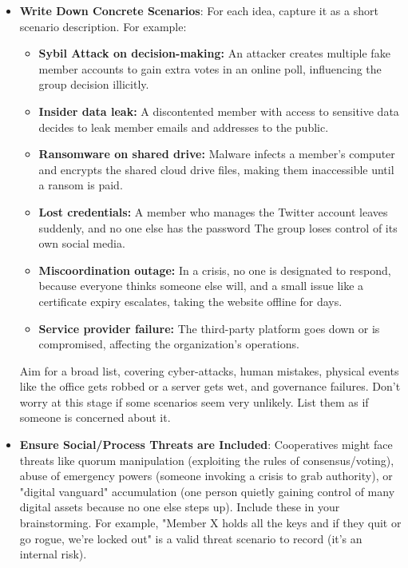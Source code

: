 \begin{itemize}
    \item \textbf{Write Down Concrete Scenarios}:
    For each idea, capture it as a short scenario description.
    For example:

    \begin{itemize}
        \item \textbf{Sybil Attack on decision-making:} An attacker creates multiple fake member
        accounts to gain extra votes in an online poll, influencing the group decision illicitly.
        \item \textbf{Insider data leak:} A discontented member with access to sensitive data decides to leak member
        emails and addresses to the public.
        \item \textbf{Ransomware on shared drive:} Malware infects a member's computer and encrypts the shared cloud
        drive files, making them inaccessible until a ransom is paid.
        \item \textbf{Lost credentials:} A member who manages the Twitter account leaves suddenly, and no one else has
        the password The group loses control of its own social media.
        \item \textbf{Miscoordination outage:} In a crisis, no one is designated to respond, because everyone thinks
        someone else will, and a small issue like a certificate expiry escalates, taking the website offline
        for days.
        \item \textbf{Service provider failure:} The third-party platform goes
        down or is compromised, affecting the organization's operations.
    \end{itemize}

    Aim for a broad list, covering cyber-attacks, human mistakes, physical events
    like the office gets robbed or a server gets wet, and governance failures. Don't
    worry at this stage if some scenarios seem very unlikely. List them as if someone
    is concerned about it.

    \item \textbf{Ensure Social/Process Threats are Included}:
    Cooperatives might face threats like quorum manipulation (exploiting the rules
    of consensus/voting), abuse of emergency powers (someone invoking a crisis to
    grab authority), or "digital vanguard" accumulation (one person quietly gaining
    control of many digital assets because no one else steps up). Include these in
    your brainstorming. For example, "Member X holds all the keys and if they quit
    or go rogue, we're locked out" is a valid threat scenario to record (it's an
    internal risk).

\end{itemize}

